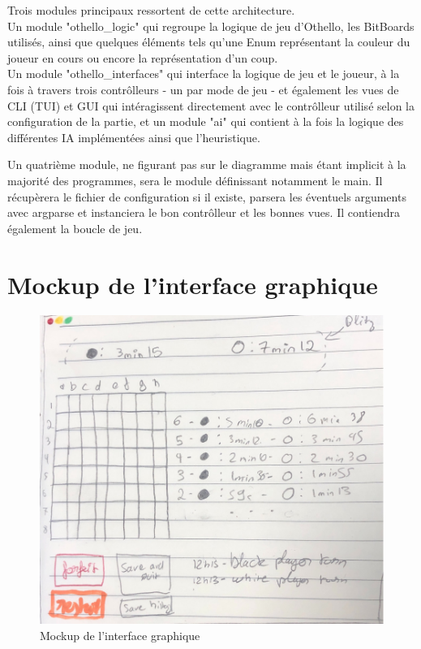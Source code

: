 \documentclass[a4paper,12pt]{article}
\begin{document}
Trois modules principaux ressortent de cette architecture.\\ Un module
"othello\_logic" qui regroupe la logique de jeu d'Othello, les BitBoards
utilisés, ainsi que quelques éléments tels qu'une Enum représentant la couleur
du joueur en cours ou encore la représentation d'un coup.\\ Un module
"othello\_interfaces" qui interface la logique de jeu et le joueur, à la fois à
travers trois contrôlleurs - un par mode de jeu - et également les vues de CLI
(TUI) et GUI qui intéragissent directement avec le contrôlleur utilisé selon la
configuration de la partie, et un module "ai" qui contient à la fois la logique
des différentes IA implémentées ainsi que l'heuristique.\pagebreak

Un quatrième module, ne figurant pas sur le diagramme mais étant implicit à la
majorité des programmes, sera le module définissant notamment le main. Il
récupèrera le fichier de configuration si il existe, parsera les éventuels
arguments avec argparse et instanciera le bon contrôlleur et les bonnes vues.
Il contiendra également la boucle de jeu.

\section{Mockup de l'interface graphique}
\begin{figure}[H]
  \centering
  \includegraphics[width=1\linewidth]{images/mockup.png}
  \caption{Mockup de l'interface graphique}
  \label{fig:mockup-interface-graphique}
\end{figure}
\end{document}
